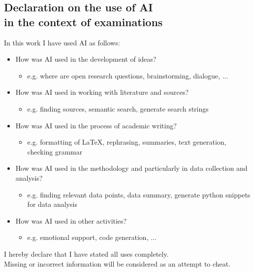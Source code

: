 \subsection*{Declaration on the use of AI\\ in the context of examinations}
\noindent In this work I have used AI as follows:
\begin{itemize}
	\item How was AI used in the development of ideas?
    \begin{itemize}
        \item e.g. where are open research questions, brainstorming, dialogue, ...
    \end{itemize}
	\item How was AI used in working with literature and sources?
    \begin{itemize}
        \item e.g. finding sources, semantic search, generate search strings
    \end{itemize}
	\item How was AI used in the process of academic writing?
    \begin{itemize}
        \item e.g. formatting of LaTeX, rephrasing, summaries, text generation, checking grammar
    \end{itemize}
	\item How was AI used in the methodology and particularly in data collection and analysis?
    \begin{itemize}
        \item e.g. finding relevant data points, data summary, generate python snippets for data analysis
    \end{itemize}
	\item How was AI used in other activities?
    \begin{itemize}
        \item e.g. emotional support, code generation, ...
    \end{itemize}
\end{itemize}
I hereby declare that I have stated all uses completely.\\
Missing or incorrect information will be considered as an attempt to cheat.